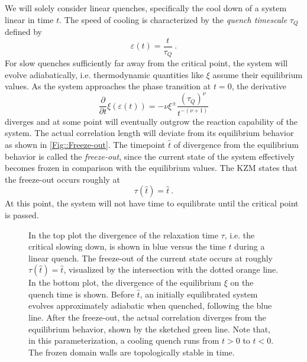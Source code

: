 	We will solely consider linear quenches, specifically the cool down of a system linear in time $t$. The speed of cooling is characterized by the \textit{quench timescale} $\tau_Q$ defined by
	\begin{equation} \label{Eq::Linear-Quench}
		\varepsilon(t) =	\frac{t}{\tau_Q}~.
	\end{equation}
	For slow quenches sufficiently far away from the critical point, the system will evolve adiabatically, i.e. thermodynamic quantities like $\xi$ assume their equilibrium values. As the system approaches the phase transition at $t=0$, the derivative
	\begin{equation}
		\frac{\partial}{\partial t} \xi(\varepsilon(t)) =	- \nu \xi^{\pm} \frac{(\tau_Q)^\nu}{t^{-(\nu + 1)}}
	\end{equation}
	diverges and at some point will eventually outgrow the reaction capability of the system. The actual correlation length will deviate from its equilibrium behavior as shown in \autoref{Fig::Freeze-out}. The timepoint $\hat{t}$ of divergence from the equilibrium behavior is called the \textit{freeze-out}, since the current state of the system effectively becomes frozen in comparison with the equilibrium values. The KZM states that the freeze-out occurs roughly at
	\begin{equation}
		\tau(\hat{t}) = \hat{t}~.
	\end{equation}
	At this point, the system will not have time to equilibrate until the critical point is passed.
	\begin{figure}
		\centering
		
		\caption{In the top plot the divergence of the relaxation time $\tau$, i.e. the critical slowing down, is shown in blue versus the time $t$ during a linear quench. The freeze-out of the current state occurs at roughly $\tau(\hat{t}) =	\hat{t}$, visualized by the intersection with the dotted orange line. In the bottom plot, the divergence of the equilibrium $\xi$ on the quench time is shown. Before $\hat{t}$, an initially equilibrated system evolves approximately adiabatic when quenched, following the blue line. After the freeze-out, the actual correlation diverges from the equilibrium behavior, shown by the sketched green line. Note that, in this parameterization, a cooling quench runs from $t > 0$ to $t < 0$. The frozen domain walls are topologically stable in time.}
		\label{Fig::Freeze-out}
	\end{figure}
